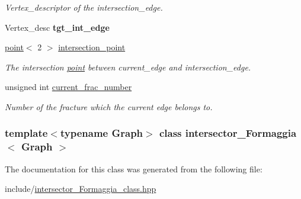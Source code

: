 \begin{DoxyCompactItemize}
\begin{DoxyCompactList}\small\item\em Vertex\_\-descriptor of the intersection\_\-edge. \item\end{DoxyCompactList}\item 
\hypertarget{classintersector__Formaggia_aa441caf6783aaab8639e98de835291b4}{
Vertex\_\-desc {\bfseries tgt\_\-int\_\-edge}}
\label{classintersector__Formaggia_aa441caf6783aaab8639e98de835291b4}

\item 
\hypertarget{classintersector__Formaggia_af305d3114e2890bfc3c9f2ca6ba7d734}{
\hyperlink{classpoint}{point}$<$ 2 $>$ \hyperlink{classintersector__Formaggia_af305d3114e2890bfc3c9f2ca6ba7d734}{intersection\_\-point}}
\label{classintersector__Formaggia_af305d3114e2890bfc3c9f2ca6ba7d734}

\begin{DoxyCompactList}\small\item\em The intersection \hyperlink{classpoint}{point} between current\_\-edge and intersection\_\-edge. \item\end{DoxyCompactList}\item 
\hypertarget{classintersector__Formaggia_a398fa8bcee7bbdba66aef87a7b105106}{
unsigned int \hyperlink{classintersector__Formaggia_a398fa8bcee7bbdba66aef87a7b105106}{current\_\-frac\_\-number}}
\label{classintersector__Formaggia_a398fa8bcee7bbdba66aef87a7b105106}

\begin{DoxyCompactList}\small\item\em Number of the fracture which the current edge belongs to. \item\end{DoxyCompactList}\end{DoxyCompactItemize}
\subsubsection*{template$<$typename Graph$>$ class intersector\_\-Formaggia$<$ Graph $>$}



The documentation for this class was generated from the following file:\begin{DoxyCompactItemize}
\item 
include/\hyperlink{intersector__Formaggia__class_8hpp}{intersector\_\-Formaggia\_\-class.hpp}\end{DoxyCompactItemize}
